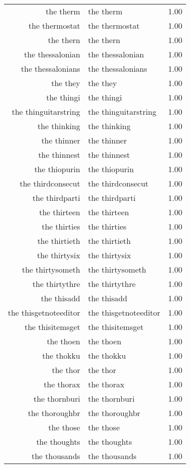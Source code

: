 \begin{table}[ht]
\begin{tabular}{rlr}
  the therm & the therm & 1.00 \\ 
  the thermostat & the thermostat & 1.00 \\ 
  the thern & the thern & 1.00 \\ 
  the thessalonian & the thessalonian & 1.00 \\ 
  the thessalonians & the thessalonians & 1.00 \\ 
  the they & the they & 1.00 \\ 
  the thingi & the thingi & 1.00 \\ 
  the thinguitarstring & the thinguitarstring & 1.00 \\ 
  the thinking & the thinking & 1.00 \\ 
  the thinner & the thinner & 1.00 \\ 
  the thinnest & the thinnest & 1.00 \\ 
  the thiopurin & the thiopurin & 1.00 \\ 
  the thirdconsecut & the thirdconsecut & 1.00 \\ 
  the thirdparti & the thirdparti & 1.00 \\ 
  the thirteen & the thirteen & 1.00 \\ 
  the thirties & the thirties & 1.00 \\ 
  the thirtieth & the thirtieth & 1.00 \\ 
  the thirtysix & the thirtysix & 1.00 \\ 
  the thirtysometh & the thirtysometh & 1.00 \\ 
  the thirtythre & the thirtythre & 1.00 \\ 
  the thisadd & the thisadd & 1.00 \\ 
  the thisgetnoteeditor & the thisgetnoteeditor & 1.00 \\ 
  the thisitemsget & the thisitemsget & 1.00 \\ 
  the thoen & the thoen & 1.00 \\ 
  the thokku & the thokku & 1.00 \\ 
  the thor & the thor & 1.00 \\ 
  the thorax & the thorax & 1.00 \\ 
  the thornburi & the thornburi & 1.00 \\ 
  the thoroughbr & the thoroughbr & 1.00 \\ 
  the those & the those & 1.00 \\ 
  the thoughts & the thoughts & 1.00 \\ 
  the thousands & the thousands & 1.00 \\ 

\end{tabular}
\end{table}
